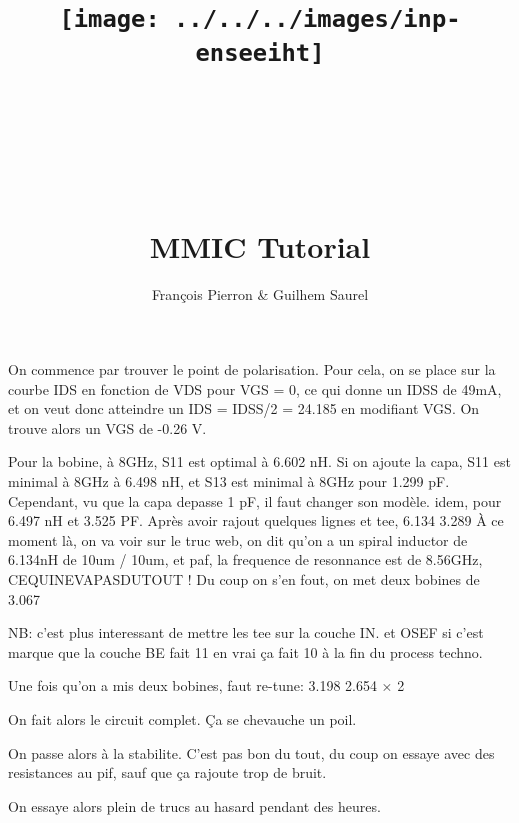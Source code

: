\documentclass{article}
\title{\texttt{[image: ../../../images/inp-enseeiht]} \\ ~ \\ ~ \\ ~ \\ ~ \\ MMIC Tutorial}
\author{François Pierron \& Guilhem Saurel}
\date{\oldstylenums{\today}}
\begin{document}
\begin{titlepage}
    \setcounter{page}{0}
    \maketitle
    \thispagestyle{empty}
\end{titlepage}

\tableofcontents

On commence par trouver le point de polarisation. Pour cela, on se place sur la courbe IDS en fonction de VDS pour VGS = 0, ce qui donne un IDSS de 49mA, et on veut donc atteindre un IDS = IDSS/2 = 24.185 en modifiant VGS. On trouve alors un VGS de -0.26 V.

Pour la bobine, à 8GHz, S11 est optimal à 6.602 nH.
Si on ajoute la capa, S11 est minimal à 8GHz à 6.498 nH, et S13 est minimal à 8GHz pour 1.299 pF.
Cependant, vu que la capa depasse 1 pF, il faut changer son modèle.
idem, pour 6.497 nH et 3.525 PF.
Après avoir rajout quelques lignes et tee, 6.134 3.289
À ce moment là, on va voir sur le truc web, on dit qu’on a un spiral inductor de 6.134nH de 10um / 10um, et paf, la frequence de resonnance est de 8.56GHz, CEQUINEVAPASDUTOUT !
Du coup on s’en fout, on met deux bobines de 3.067

NB: c’est plus interessant de mettre les tee sur la couche IN. et OSEF si c’est marque que la couche BE fait 11 en vrai ça fait 10 à la fin du process techno.

Une fois qu’on a mis deux bobines, faut re-tune: 3.198 2.654 × 2

On fait alors le circuit complet. Ça se chevauche un poil.

On passe alors à la stabilite. C’est pas bon du tout, du coup on essaye avec des resistances au pif, sauf que ça rajoute trop de bruit.

On essaye alors plein de trucs au hasard pendant des heures.
\end{document}
